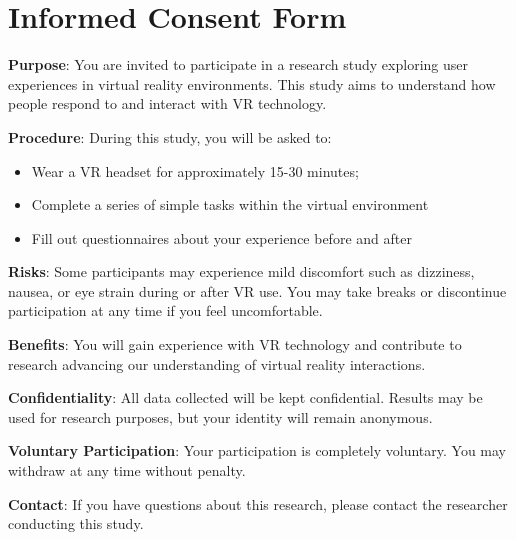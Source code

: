 
%


\chapter{Informed Consent Form}
\label{app:consent}

\textbf{Purpose}: You are invited to participate in a research study exploring user experiences in virtual reality environments. This study aims to understand how people respond to and interact with VR technology.

\textbf{Procedure}: During this study, you will be asked to:
\begin{itemize}
    \item Wear a VR headset for approximately 15-30 minutes;
    \item Complete a series of simple tasks within the virtual environment
    \item Fill out questionnaires about your experience before and after
\end{itemize}

\textbf{Risks}: Some participants may experience mild discomfort such as dizziness, nausea, or eye strain during or after VR use. You may take breaks or discontinue participation at any time if you feel uncomfortable.

\textbf{Benefits}: You will gain experience with VR technology and contribute to research advancing our understanding of virtual reality interactions.

\textbf{Confidentiality}: All data collected will be kept confidential. Results may be used for research purposes, but your identity will remain anonymous.

\textbf{Voluntary Participation}: Your participation is completely voluntary. You may withdraw at any time without penalty.

\textbf{Contact}: If you have questions about this research, please contact the researcher conducting this study.


